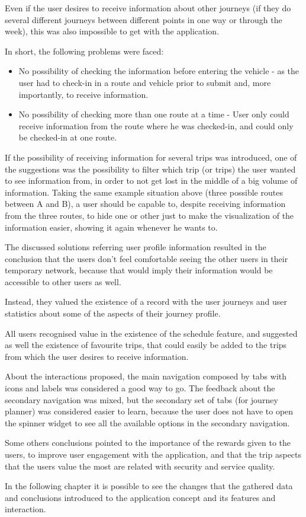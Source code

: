 Even if the user desires to receive information about other journeys (if they do several different journeys between different points in one way or through the week), this was also impossible to get with the application.

In short, the following problems were faced: 

\begin{itemize}
\item No possibility of checking the information before entering the vehicle - as the user had to check-in in a route and vehicle prior to  submit and, more importantly, to receive information. 
\item No possibility of checking more than one route at a time - User only could receive information from the route where he was checked-in, and could only be checked-in at one route. 
\end{itemize}

If the possibility of receiving information for several trips was introduced, one of the suggestions was the possibility to filter which trip (or trips) the user wanted to see information from, in order to not get lost in the middle of a big volume of information. Taking the same example situation above (three possible routes between A and B), a user should be capable to, despite receiving information from the three routes, to hide one or other just to make the visualization of the information easier, showing it again whenever he wants to. 

The discussed solutions referring user profile information resulted in the conclusion that the users don't feel comfortable seeing the other users in their temporary network, because that would imply their information would be accessible to other users as well. 

Instead, they valued the existence of a record with the user journeys and user statistics about some of the aspects of their journey profile.

All users recognised value in the existence of the schedule feature, and suggested as well the existence of favourite trips, that could easily be added to the trips from which the user desires to receive information.

About the interactions proposed, the main navigation composed by tabs with icons and labels was considered a good way to go. The feedback about the secondary navigation was mixed, but the secondary set of tabs (for journey planner) was considered easier to learn, because the user does not have to open the spinner widget to see all the available options in the secondary navigation.

Some others conclusions pointed to the importance of the rewards given to the users, to improve user engagement with the application, and that the trip aspects that the users value the most are related with security and service quality.


In the following chapter it is possible to see the changes that the gathered data and conclusions introduced to the application concept and its features and interaction.
